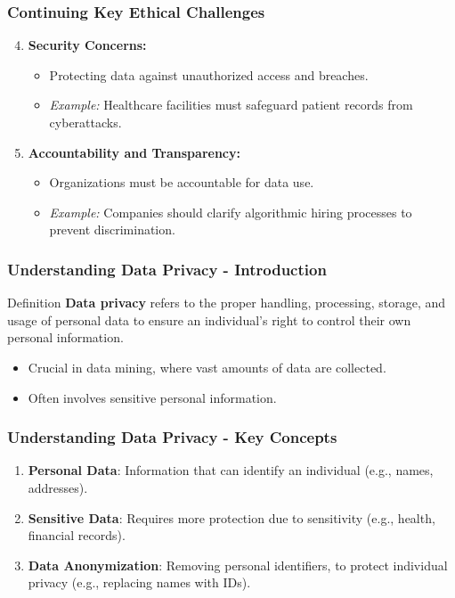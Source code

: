 \documentclass[aspectratio=169]{beamer}
\begin{document}
\begin{frame}[fragile]
    \frametitle{Continuing Key Ethical Challenges}
    \begin{enumerate}
        \setcounter{enumi}{3} %
        \item \textbf{Security Concerns:}
            \begin{itemize}
                \item Protecting data against unauthorized access and breaches.
                \item \textit{Example:} Healthcare facilities must safeguard patient records from cyberattacks.
            \end{itemize}
        
        \item \textbf{Accountability and Transparency:}
            \begin{itemize}
                \item Organizations must be accountable for data use.
                \item \textit{Example:} Companies should clarify algorithmic hiring processes to prevent discrimination.
            \end{itemize}
    \end{enumerate}
\end{frame}

\begin{frame}[fragile]
    \frametitle{Understanding Data Privacy - Introduction}
    \begin{block}{Definition}
        \textbf{Data privacy} refers to the proper handling, processing, storage, and usage of personal data to ensure an individual's right to control their own personal information.
    \end{block}
    \begin{itemize}
        \item Crucial in data mining, where vast amounts of data are collected.
        \item Often involves sensitive personal information.
    \end{itemize}
\end{frame}

\begin{frame}[fragile]
    \frametitle{Understanding Data Privacy - Key Concepts}
    \begin{enumerate}
        \item \textbf{Personal Data}: Information that can identify an individual (e.g., names, addresses).
        \item \textbf{Sensitive Data}: Requires more protection due to sensitivity (e.g., health, financial records).
        \item \textbf{Data Anonymization}: Removing personal identifiers, to protect individual privacy (e.g., replacing names with IDs).
    \end{enumerate}
\end{frame}
\end{document}
